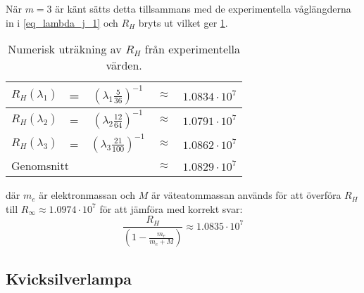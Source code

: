 När $m=3$ är känt sätts detta tillsammans med  de experimentella våglängderna in i \cref{eq_lambda_j_1} och $R_H$ bryts ut vilket ger \cref{tb_R_H}.
\begin{table}[htb]
	\caption{Numerisk uträkning av $R_H$ från experimentella värden.}
    \label{tb_R_H}
    \begin{center}
    \renewcommand{\arraystretch}{1.3}
		\begin{tabular}{| c c c c c |}
			\hline
            \rule{0pt}{3ex}$R_H(\lambda_1)$ & = & $\left(\lambda_1\frac{5}{36}\right)^{-1}$ & $\approx$ & $1.0834\cdot10^7$ \\
            \hline
            \rule{0pt}{3ex}$R_H(\lambda_2)$ & = & $\left(\lambda_2\frac{12}{64}\right)^{-1}$ & $\approx$ & $1.0791\cdot10^7$ \\
            \hline
            \rule{0pt}{3ex}$R_H(\lambda_3)$ & = & $\left(\lambda_3\frac{21}{100}\right)^{-1}$ & $\approx$ & $1.0862\cdot10^7$ \\
            \hline
            \multicolumn{3}{|l}{Genomsnitt} & $\approx$ & $1.0829\cdot10^{7}$ \\
            \hline
		\end{tabular}
	\end{center}
\end{table}
 där $m_e$ är elektronmassan och $M$ är väteatommassan används för att överföra $R_H$ till $R_\infty\approx1.0974\cdot10^7$ för att jämföra med korrekt svar:
\begin{equation}
	\frac{R_H}{\left(1-\frac{m_e}{m_e+M}\right)}\approx1.0835\cdot10^7
    \label{eq_R_Rinf}
\end{equation}

\subsection*{Kvicksilverlampa}

